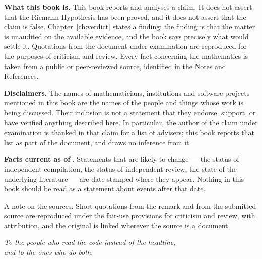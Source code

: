 \noindent\textbf{What this book is.} This book reports and analyses a claim. It
does not assert that the Riemann Hypothesis has been proved, and it does not assert
that the claim is false. Chapter~\ref{ch:verdict} states a finding; the finding is that the
matter is unaudited on the available evidence, and the book says precisely what
would settle it. Quotations from the document under examination are reproduced for
the purposes of criticism and review. Every fact concerning the mathematics is
taken from a public or peer-reviewed source, identified in the Notes and
References.\par
\vspace{10pt}
\noindent\textbf{Disclaimers.} The names of mathematicians, institutions and
software projects mentioned in this book are the names of the people and things
whose work is being discussed. Their inclusion is not a statement that they
endorse, support, or have verified anything described here. In particular, the
author of the claim under examination is thanked in that claim for a list of
advisers; this book reports that list as part of the document, and draws no
inference from it.\par
\vspace{10pt}
\noindent\textbf{Facts current as of} \bookFactsDate. Statements that are likely to
change --- the status of independent compilation, the status of independent
review, the state of the underlying literature --- are date-stamped where they
appear. Nothing in this book should be read as a statement about events after
that date.\par
\vspace{8pt}
\noindent{\color{accent}\rule{\textwidth}{0.4pt}}\par
\vspace{8pt}
{\small\color{txtdim}\sffamily
\noindent A note on the sources. Short quotations from the remark and from
the submitted source are reproduced under the fair-use provisions for criticism
and review, with attribution, and the original is linked wherever the source
is a document.\par}

\clearpage
\thispagestyle{empty}
\vspace*{2.5in}
  \begin{center}
    {\large\itshape\color{txt}
      To the people who read the code instead of the headline,\\
      \hspace*{1em}and to the ones who do both.\par}
  \end{center}
  \vfill
\clearpage

